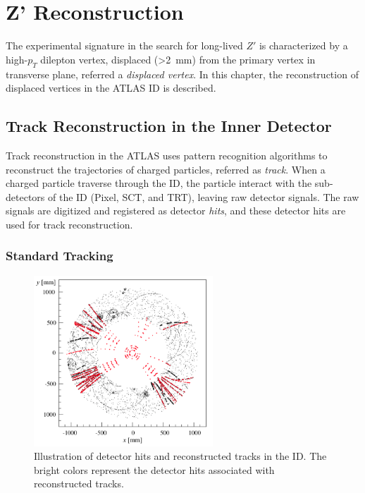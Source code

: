 \chapter{Z' Reconstruction}
\label{chap:reco}

The experimental signature in the search for long-lived $Z'$ is characterized by a high-$p_{T}$ dilepton vertex, displaced (>2~\si{\milli\meter}) from the primary vertex in transverse plane, referred a \textit{displaced vertex}. In this chapter, the reconstruction of displaced vertices in the ATLAS ID is described.

\section{Track Reconstruction in the Inner Detector}
\label{sec:reco:track}

Track reconstruction in the ATLAS uses pattern recognition algorithms to reconstruct the trajectories of charged particles, referred as \textit{track}. When a charged particle traverse through the ID, the particle interact with the sub-detectors of the ID (Pixel, SCT, and TRT), leaving raw detector signals. The raw signals are digitized and registered as detector \textit{hits}, and these detector hits are used for track reconstruction. 

\subsection{Standard Tracking}
\label{sec:reco:st}


\begin{figure}[!htb]
    \includegraphics[width=0.6\textwidth]{figures/tracking.png}
    \centering
    \caption{Illustration of detector hits and reconstructed tracks in the ID. The bright colors represent the detector hits associated with reconstructed tracks.}
    \label{fig:tracking}
\end{figure}

